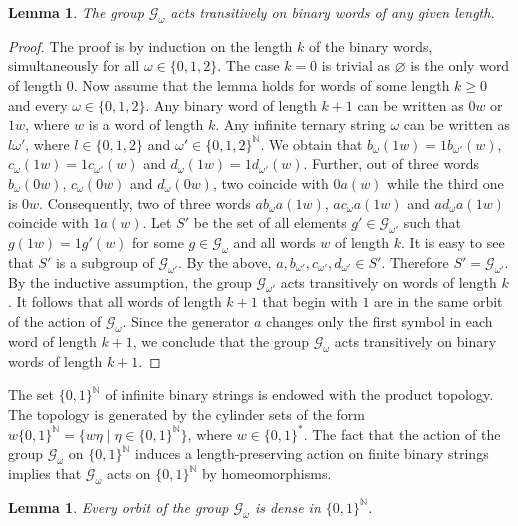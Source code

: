 \documentclass[12pt]{article}
\newtheorem{lemma}[theorem]{Lemma}
\theoremstyle{definition}
\def\bN{\mathbb{N}}
\def\cG{\mathcal{G}}
\def\om{\omega}
\begin{document}
\begin{lemma}\label{transitive-on-levels}
The group $\cG_\om$ acts transitively on binary words of any given length.
\end{lemma}

\begin{proof}
The proof is by induction on the length $k$ of the binary words, 
simultaneously for all $\om\in\{0,1,2\}$.  The case $k=0$ is trivial as 
$\varnothing$ is the only word of length $0$.  Now assume that the lemma 
holds for words of some length $k\ge0$ and every $\om\in\{0,1,2\}$.  Any 
binary word of length $k+1$ can be written as $0w$ or $1w$, where $w$ is a 
word of length $k$.  Any infinite ternary string $\om$ can be written as 
$l\om'$, where $l\in\{0,1,2\}$ and $\om'\in\{0,1,2\}^{\bN}$.  We obtain 
that $b_\om(1w)=1b_{\om'}(w)$, $c_\om(1w)=1c_{\om'}(w)$ and 
$d_\om(1w)=1d_{\om'}(w)$.  Further, out of three words $b_\om(0w)$, 
$c_\om(0w)$ and $d_\om(0w)$, two coincide with $0a(w)$ while the third one 
is $0w$.  Consequently, two of three words $ab_\om a(1w)$, $ac_\om a(1w)$ 
and $ad_\om a(1w)$ coincide with $1a(w)$.  Let $S'$ be the set of all 
elements $g'\in\cG_{\om'}$ such that $g(1w)=1g'(w)$ for some $g\in\cG_\om$ 
and all words $w$ of length $k$.  It is easy to see that $S'$ is a subgroup 
of $\cG_{\om'}$.  By the above, $a,b_{\om'},c_{\om'},d_{\om'}\in S'$.  
Therefore $S'=\cG_{\om'}$.  By the inductive assumption, the group 
$\cG_{\om'}$ acts transitively on words of length $k$.  It follows that all 
words of length $k+1$ that begin with $1$ are in the same orbit of the 
action of $\cG_\om$.  Since the generator $a$ changes only the first symbol 
in each word of length $k+1$, we conclude that the group $\cG_\om$ acts 
transitively on binary words of length $k+1$.
\end{proof}

The set $\{0,1\}^{\bN}$ of infinite binary strings is endowed with the 
product topology.  The topology is generated by the cylinder sets of the 
form $w\{0,1\}^{\bN}=\bigl\{w\eta\mid\eta\in\{0,1\}^{\bN}\bigr\}$, where 
$w\in\{0,1\}^*$.  The fact that the action of the group $\cG_\om$ on 
$\{0,1\}^{\bN}$ induces a length-preserving action on finite binary strings 
implies that $\cG_\om$ acts on $\{0,1\}^{\bN}$ by homeomorphisms.

\begin{lemma}\label{density-of-orbits}
Every orbit of the group $\cG_\om$ is dense in $\{0,1\}^{\bN}$.
\end{lemma}
\end{document}
